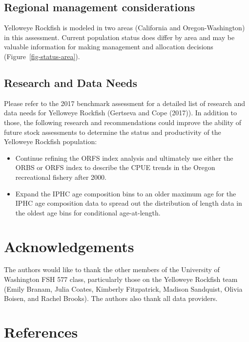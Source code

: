 \documentclass[
]{scrartcl}
\providecommand{\tightlist}{%
  \setlength{\itemsep}{0pt}\setlength{\parskip}{0pt}}\usepackage{longtable,booktabs,array}
\begin{document}
\subsection{Regional management
considerations}\label{regional-management-considerations}

Yelloweye Rockfish is modeled in two areas (California and
Oregon-Washington) in this assessment. Current population status does
differ by area and may be valuable information for making management and
allocation decisions (Figure~\ref{fig-status-area}).

\subsection{Research and Data Needs}\label{research-and-data-needs-1}

Please refer to the 2017 benchmark assessment for a detailed list of
research and data needs for Yelloweye Rockfish (Gertseva and Cope
(2017)). In addition to those, the following research and
recommendations could improve the ability of future stock assessments to
determine the status and productivity of the Yelloweye Rockfish
population:

\begin{itemize}
\tightlist
\item
  Continue refining the ORFS index analysis and ultimately use either
  the ORBS or ORFS index to describe the CPUE trends in the Oregon
  recreational fishery after 2000.
\item
  Expand the IPHC age composition bins to an older maximum age for the
  IPHC age composition data to spread out the distribution of length
  data in the oldest age bins for conditional age-at-length.
\end{itemize}

\newpage{}

\section{Acknowledgements}\label{sec-acknowledgements}

The authors would like to thank the other members of the University of
Washington FSH 577 class, particularly those on the Yelloweye Rockfish
team (Emily Branam, Julia Coates, Kimberly Fitzpatrick, Madison
Sandquist, Olivia Boisen, and Rachel Brooks). The authors also thank all
data providers.

\newpage{}

\section{References}\label{references}
\end{document}
